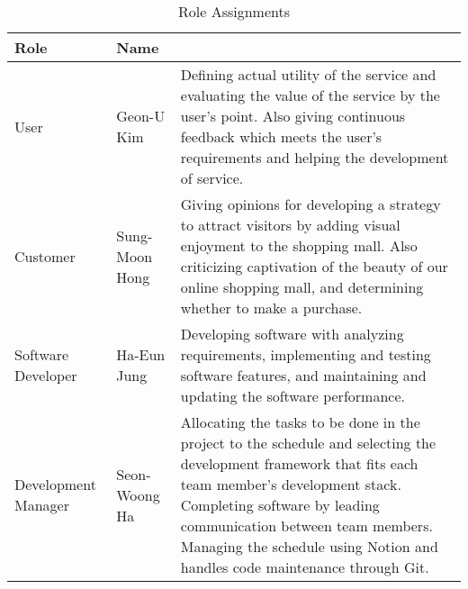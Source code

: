 \documentclass[conference]{IEEEtran}
\begin{document}
\begin{table}[ht!] 
\renewcommand\arraystretch{1.25}
\begin{threeparttable}
    \caption{Role Assignments \label{tab:table1}} 
    \footnotesize
    \begin{tabular}{@{}p{1.5cm} p{1.7cm}>{\raggedright\arraybackslash}p{4.7cm}@{}} %
    \toprule
    \bfseries Role & \bfseries Name & \multicolumn{1}{l}{\bfseries Task description and etc.} \\
    \midrule
    User & Geon-U Kim & Defining actual utility of the service \newline and evaluating the value of the service \newline by the user's point. Also giving \newline continuous feedback which meets the \newline user's requirements and helping the \newline development of service.\\
    Customer & Sung-Moon Hong & Giving opinions for developing a \newline strategy to attract visitors by adding \newline visual enjoyment to the shopping mall. \newline Also criticizing captivation of the \newline beauty of our online shopping mall, \newline and determining whether to make a \newline purchase.\\
    Software Developer & Ha-Eun Jung & Developing software with analyzing \newline requirements, implementing and \newline testing software features, and \newline maintaining and updating the software \newline performance.\\
    Development Manager & Seon-Woong Ha & Allocating the tasks to be done in the \newline project to the schedule and selecting \newline the development framework that fits \newline each team member's development \newline stack. Completing software by leading \newline communication between team \newline members. Managing the schedule \newline using Notion and handles code \newline maintenance through Git.\\
    \bottomrule
    \end{tabular}
\end{threeparttable}
\end{table}
\end{document}
